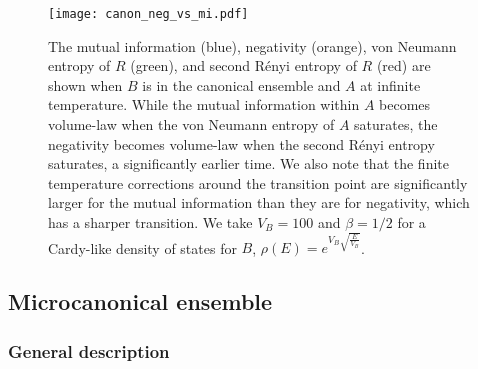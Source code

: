 \documentclass[a4paper,11pt]{article}
\begin{document}
\begin{enumerate}
\begin{figure}[!h] 
\begin{center}
\texttt{[image: canon\_neg\_vs\_mi.pdf]}
\end{center}
\caption{The mutual information (blue), negativity (orange), von Neumann entropy of $R$ (green), and second R\'enyi entropy of $R$ (red) are shown when $B$ is in the canonical ensemble and $A$ at infinite temperature. While the mutual information within $A$ becomes volume-law when the von Neumann entropy of $A$ saturates, the negativity becomes volume-law when the second R\'enyi entropy saturates, a significantly earlier time. We also note that the finite temperature corrections around the transition point are significantly larger for the mutual information than they are for negativity, which has a sharper transition. We take $V_B = 100$ and $\beta = 1/2$ for a Cardy-like density of states for $B$, $\rho(E) = e^{V_B \sqrt{\frac{E}{V_B}}} $.}
\label{fig:canon_neg_vs_mi}
\end{figure} 



\subsection{Microcanonical ensemble} \label{sec:micro}


\subsubsection{General description} 


\end{enumerate}
\end{document}

